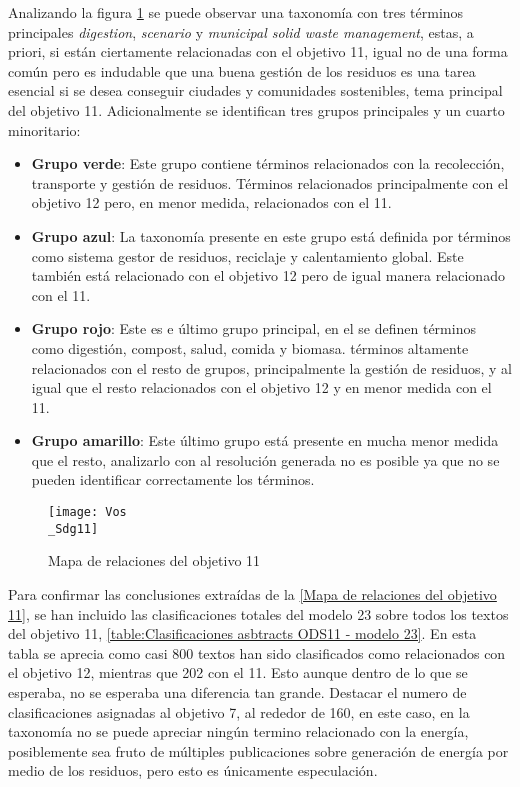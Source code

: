 Analizando la figura \cref{Mapa de relaciones del objetivo 11} se puede observar una
taxonomía con tres términos principales \textit{digestion}, \textit{scenario} y
\textit{municipal solid waste management}, estas, a priori, si están ciertamente
relacionadas con el objetivo 11, igual no de una forma común pero es indudable
que una buena gestión de los residuos es una tarea esencial si se desea
conseguir ciudades y comunidades sostenibles, tema principal del objetivo 11.
Adicionalmente se identifican tres grupos principales y un cuarto minoritario:
\begin{itemize}
    \item \textbf{Grupo verde}: Este grupo contiene términos relacionados con
    la recolección, transporte y gestión de residuos. Términos relacionados
    principalmente con el objetivo 12 pero, en menor medida, relacionados con el 11.
    \item \textbf{Grupo azul}: La taxonomía presente en este grupo está definida
    por términos como sistema gestor de residuos, reciclaje y calentamiento
    global. Este también está relacionado con el objetivo 12 pero de igual
    manera relacionado con el 11.
    \item \textbf{Grupo rojo}: Este es e último grupo principal, en el se
    definen términos como digestión, compost, salud, comida y biomasa. términos
    altamente relacionados con el resto de grupos, principalmente la gestión de
    residuos, y al igual que el resto relacionados con el objetivo 12 y en
    menor medida con el 11. 
    \item \textbf{Grupo amarillo}: Este último grupo está presente en mucha
    menor medida que el resto, analizarlo con al resolución generada no es
    posible ya que no se pueden identificar correctamente los términos.
\end{itemize}
 
\begin{figure}[H]
    \centering
    \texttt{[image: Vos\\\_Sdg11]}
    \captionsetup{justification=centering}
    \caption{Mapa de relaciones del objetivo 11}
    \label{Mapa de relaciones del objetivo 11}
\end{figure}

Para confirmar las conclusiones extraídas de la \cref{Mapa de relaciones
del objetivo 11}, se han incluido las clasificaciones totales del modelo 23
sobre todos los textos del objetivo 11, \cref{table:Clasificaciones asbtracts
ODS11 - modelo 23}. En esta tabla se aprecia como casi 800 textos han sido
clasificados como relacionados con el objetivo 12, mientras que 202 con el 11.
Esto aunque dentro de lo que se esperaba, no se esperaba una diferencia tan
grande. Destacar el numero de clasificaciones asignadas al objetivo 7, al
rededor de 160, en este caso, en la taxonomía no se puede apreciar ningún
termino relacionado con la energía, posiblemente sea fruto de múltiples
publicaciones sobre generación de energía por medio de los residuos, pero esto
es únicamente especulación.

